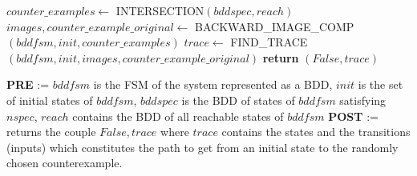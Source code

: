 \begin{algorithmic}[1]
	\State $counter\_examples \leftarrow$ INTERSECTION$(bddspec, reach)$
    \State $images,counter\_example\_original \leftarrow$ \newline
            \hspace*{5em}BACKWARD\_IMAGE\_COMP$(bddfsm, init, counter\_examples)$
    \State $trace \leftarrow$ \newline
            \hspace*{5em}FIND\_TRACE$(bddfsm, init, images, counter\_example\_original)$
    \State \textbf{return }$(False, trace)$
\EndIf
\item[] 
\State \textbf{PRE} := $bddfsm$ is the FSM of the system represented as a BDD, $init$ is the set of initial states of $bddfsm$, $bddspec$ is the BDD of states of $bddfsm$ satisfying $nspec$, $reach$ contains the BDD of all reachable states of $bddfsm$
\State \textbf{POST} := returns the couple $False, trace$ where $trace$ contains the states and the transitions (inputs) which constitutes the path to get from an initial state to the randomly chosen counterexample.
\end{algorithmic}